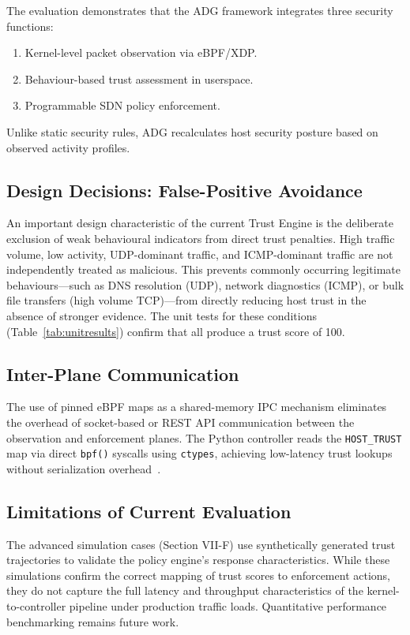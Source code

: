\documentclass[conference]{IEEEtran}
\begin{document}
The evaluation demonstrates that the ADG framework integrates three security functions:
\begin{enumerate}
\item Kernel-level packet observation via eBPF/XDP.
\item Behaviour-based trust assessment in userspace.
\item Programmable SDN policy enforcement.
\end{enumerate}

Unlike static security rules, ADG recalculates host security posture based on observed activity profiles.

\subsection{Design Decisions: False-Positive Avoidance}
An important design characteristic of the current Trust Engine is the deliberate exclusion of weak behavioural indicators from direct trust penalties. High traffic volume, low activity, UDP-dominant traffic, and ICMP-dominant traffic are not independently treated as malicious. This prevents commonly occurring legitimate behaviours---such as DNS resolution (UDP), network diagnostics (ICMP), or bulk file transfers (high volume TCP)---from directly reducing host trust in the absence of stronger evidence. The unit tests for these conditions (Table~\ref{tab:unitresults}) confirm that all produce a trust score of 100.

\subsection{Inter-Plane Communication}
The use of pinned eBPF maps as a shared-memory IPC mechanism eliminates the overhead of socket-based or REST API communication between the observation and enforcement planes. The Python controller reads the \texttt{HOST\_TRUST} map via direct \texttt{bpf()} syscalls using \texttt{ctypes}, achieving low-latency trust lookups without serialization overhead~\cite{ebpf}.

\subsection{Limitations of Current Evaluation}
The advanced simulation cases (Section VII-F) use synthetically generated trust trajectories to validate the policy engine's response characteristics. While these simulations confirm the correct mapping of trust scores to enforcement actions, they do not capture the full latency and throughput characteristics of the kernel-to-controller pipeline under production traffic loads. Quantitative performance benchmarking remains future work.
\end{document}
